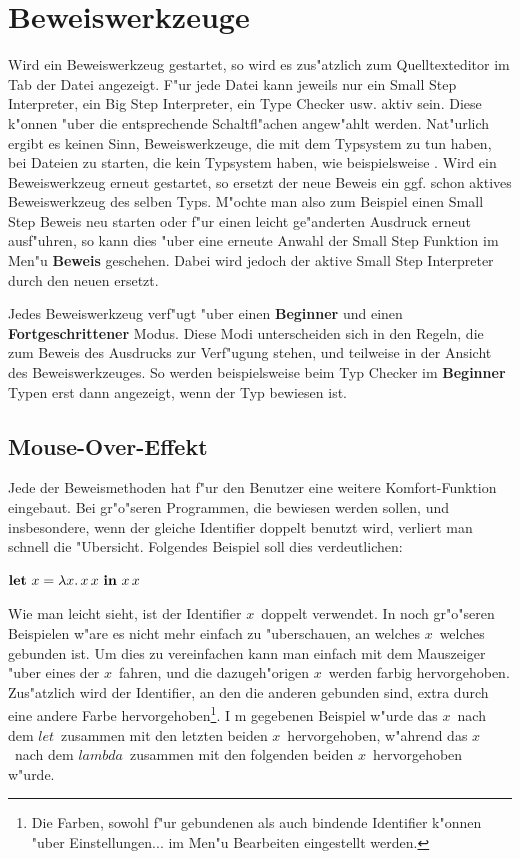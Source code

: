 \section {Beweiswerkzeuge}
\label{Beweiswerkzeuge} Wird ein Beweiswerkzeug gestartet, so wird
es zus"atzlich zum Quelltexteditor im Tab der Datei angezeigt. F"ur
jede Datei kann jeweils nur ein Small Step Interpreter, ein Big Step
Interpreter, ein Type Checker usw. aktiv sein. Diese k"onnen "uber die
entsprechende Schaltfl"achen angew"ahlt werden. Nat"urlich ergibt es keinen Sinn, Beweiswerkzeuge, die mit dem Typsystem zu tun haben, bei Dateien zu starten, die kein Typsystem haben, wie beispielsweise \LZERO. Wird ein
Beweiswerkzeug erneut gestartet, so ersetzt der neue Beweis ein ggf.
schon aktives Beweiswerkzeug des selben Typs. M"ochte man also zum
Beispiel einen Small Step Beweis neu starten oder f"ur einen leicht
ge"anderten Ausdruck erneut ausf"uhren, so kann dies "uber eine
erneute Anwahl der Small Step Funktion im Men"u {\bf Beweis}
geschehen. Dabei wird jedoch der aktive Small Step Interpreter durch
den neuen ersetzt.

Jedes Beweiswerkzeug verf"ugt "uber einen {\bf Beginner} und einen
{\bf Fortgeschrittener} Modus. Diese Modi unterscheiden sich in den
Regeln, die zum Beweis des Ausdrucks zur Verf"ugung stehen, und teilweise in der Ansicht des Beweiswerkzeuges. So werden beispielsweise beim Typ Checker im {\bf Beginner} Typen erst dann angezeigt, wenn der Typ bewiesen ist.

\subsection {Mouse-Over-Effekt}
Jede der Beweismethoden hat f"ur den Benutzer eine weitere Komfort-Funktion eingebaut. Bei gr"o"seren Programmen, 
die bewiesen werden sollen, und insbesondere, wenn der gleiche Identifier doppelt benutzt wird, verliert man schnell 
die "Ubersicht. Folgendes Beispiel soll dies verdeutlichen:

{\bf $\textbf{let}\ x = \lambda x.\,x\,x\ \textbf{in}\ x\,x$}

Wie man leicht sieht, ist der Identifier \glqq$x$\grqq\ doppelt verwendet. 
In noch gr"o"seren Beispielen w"are es nicht mehr einfach zu "uberschauen, an welches \glqq$x$\grqq\ welches gebunden ist. 
Um dies zu vereinfachen kann man einfach mit dem Mauszeiger "uber eines der \glqq$x$\grqq\ fahren, 
und die dazugeh"origen \glqq$x$\grqq\ werden farbig hervorgehoben. Zus"atzlich wird der Identifier, 
an den die anderen gebunden sind, extra durch eine andere Farbe hervorgehoben\footnote{Die Farben, sowohl f"ur gebundenen als auch bindende Identifier k"onnen "uber Einstellungen... im Men"u Bearbeiten eingestellt werden.}. I
m gegebenen Beispiel w"urde das \glqq$x$\grqq\ nach dem \glqq$let$\grqq\ zusammen mit den letzten beiden \glqq$x$\grqq\ hervorgehoben, 
w"ahrend das \glqq$x$\grqq\ nach dem \glqq$lambda$\grqq\ zusammen mit den folgenden beiden \glqq$x$\grqq\ hervorgehoben w"urde.

